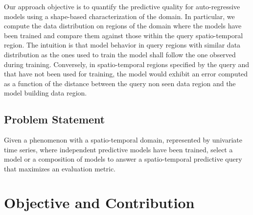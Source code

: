 Our approach objective is to quantify the predictive quality for auto-regressive models using a shape-based characterization of the domain. In particular, we compute the data distribution on regions of the domain where the models have been trained and compare them against those within the query spatio-temporal region. The intuition is that model behavior in query regions with similar data distribution as the ones used to train the model shall follow the one observed during training. Conversely, in spatio-temporal regions specified by the query and that have not been used for training, the model would exhibit an error computed as a function of the distance between the query non seen data region and the model building data region.

\subsection{Problem Statement}
\label{Sec:ProblemStatement}

Given a phenomenon with a spatio-temporal domain, represented by univariate time series, where independent predictive models have been trained, select a model or a composition of models to answer a spatio-temporal predictive query that maximizes an evaluation metric.

\section{Objective and Contribution}
\label{Sec:ObjectiveContribution}

